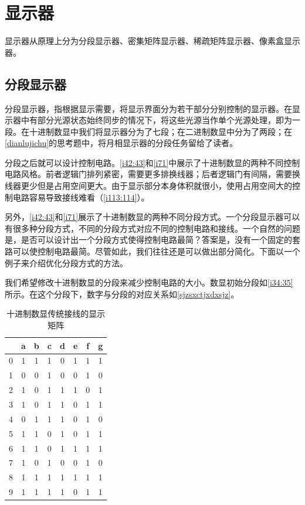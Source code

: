 \section{显示器}
显示器从原理上分为分段显示器、密集矩阵显示器、稀疏矩阵显示器、像素盒显示器。

\subsection{分段显示器}
分段显示器，指根据显示需要，将显示界面分为若干部分分别控制的显示器。在显示器中有部分光源状态始终同步的情况下，将这些光源当作单个光源处理，即为一段。在十进制数显中我们将显示器分为了七段；在二进制数显中分为了两段；在\autoref{dianlujichu}的思考题中，将月相显示器的分段任务留给了读者。

分段之后就可以设计控制电路。\autoref{i42:43}和\autoref{i71}中展示了十进制数显的两种不同控制电路风格。前者逻辑门排列紧密，需要更多排换线器；后者逻辑门有间隔，需要换线器更少但是占用空间更大。由于显示部分本身体积就很小，使用占用空间大的控制电路容易导致接线难看（\autoref{i113:114}）。

另外，\autoref{i42:43}和\autoref{i71}展示了十进制数显的两种不同分段方式。一个分段显示器可以有很多种分段方式，不同的分段方式对应不同的控制电路和接线。一个自然的问题是，是否可以设计出一个分段方式使得控制电路最简？答案是，没有一个固定的套路可以使控制电路最简。尽管如此，我们往往还是可以做出部分简化。下面以一个例子来介绍优化分段方式的方法。

我们希望修改十进制数显的分段来减少控制电路的大小。数显初始分段如\autoref{i34:35}所示。在这个分段下，数字与分段的对应关系如\autoref{sjzsxctjxdxsjz}。

\begin{table}[!ht]
\centering
\begin{tabular}{c|ccccccc}
&a&b&c&d&e&f&g\\\hline
0&1&1&1&0&1&1&1\\
1&0&0&1&0&0&1&0\\
2&1&0&1&1&1&0&1\\
3&1&0&1&1&0&1&1\\
4&0&1&1&1&0&1&0\\
5&1&1&0&1&0&1&1\\
6&1&1&0&1&1&1&1\\
7&1&0&1&0&0&1&0\\
8&1&1&1&1&1&1&1\\
9&1&1&1&1&0&1&1
\end{tabular}
\caption{十进制数显传统接线的显示矩阵}\label{sjzsxctjxdxsjz}
\end{table}

